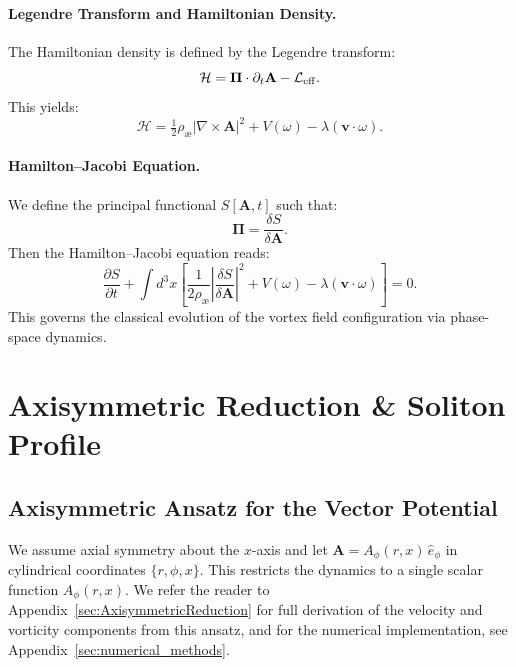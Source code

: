 \documentclass[preprint,notitlepage]{revtex4-2}
\begin{document}
    \paragraph{Legendre Transform and Hamiltonian Density.}
    The Hamiltonian density is defined by the Legendre transform:
    \begin{equation}
      \mathcal{H} = \boldsymbol\Pi \cdot \partial_t \mathbf A - \mathcal{L}_{\rm eff}.
    \end{equation}
    This yields:
    \begin{equation}
        \mathcal H = \tfrac12 \rho_{æ} |\nabla \times \mathbf A|^2 + V(\omega) - \lambda (\mathbf v \cdot \omega).
    \end{equation}

    \paragraph{Hamilton–Jacobi Equation.}
    We define the principal functional $S[\mathbf A, t]$ such that:
    \begin{equation}
        \boldsymbol\Pi = \frac{\delta S}{\delta \mathbf A}.
    \end{equation}
    Then the Hamilton–Jacobi equation reads:
    \begin{equation}
        \frac{\partial S}{\partial t} + \int d^3x \left[ \frac{1}{2 \rho_{æ}} \left| \frac{\delta S}{\delta \mathbf A} \right|^2 + V(\omega) - \lambda (\mathbf v \cdot \omega) \right] = 0.
    \end{equation}
    This governs the classical evolution of the vortex field configuration via phase-space dynamics.


\section{Axisymmetric Reduction \& Soliton Profile}
    \subsection{Axisymmetric Ansatz for the Vector Potential}
    We assume axial symmetry about the $x$-axis and let $\mathbf A = A_\phi(r,x)\,\hat e_\phi$ in cylindrical coordinates $\{r, \phi, x\}$.
    This restricts the dynamics to a single scalar function $A_\phi(r,x)$.
    We refer the reader to Appendix~\ref{sec:AxisymmetricReduction} for full derivation of the velocity and vorticity components from this ansatz, and for the numerical implementation, see Appendix~\ref{sec:numerical_methods}.
\end{document}

